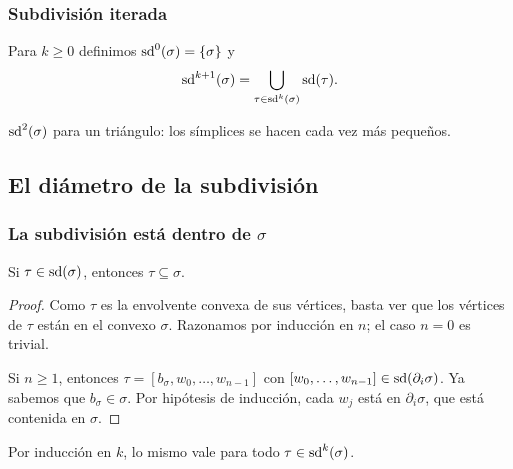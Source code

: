 \begin{frame}
  \frametitle{Subdivisión iterada}

  \begin{definition}
    Para $k\geq0$ definimos $\operatorname{sd}^0(\sigma)=\{\sigma\}$ y
    \[
      \operatorname{sd}^{k+1}(\sigma)=\bigcup_{\tau\in\operatorname{sd}^k(\sigma)}\operatorname{sd}(\tau).
    \]
  \end{definition}

  \begin{center}
  \end{center}

  \centering
  $\operatorname{sd}^2(\sigma)$ para un triángulo: los símplices se hacen
  \alert{cada vez más pequeños}.
\end{frame}

\subsection{El diámetro de la subdivisión}

\begin{frame}
  \frametitle{La subdivisión está dentro de $\sigma$}

  \begin{lemma}
    Si $\tau\in\operatorname{sd}(\sigma)$, entonces $\tau\subseteq\sigma$.
  \end{lemma}

  \begin{proof}
    Como $\tau$ es la envolvente convexa de sus vértices, basta ver que los
    vértices de $\tau$ están en el convexo $\sigma$. Razonamos por
    inducción en $n$; el caso $n=0$ es trivial.

    \medskip

    Si $n\geq1$, entonces $\tau=[b_\sigma,w_0,\ldots,w_{n-1}]$ con
    $[w_0,\ldots,w_{n-1}]\in\operatorname{sd}(\partial_i\sigma)$. Ya sabemos que
    $b_\sigma\in\sigma$. Por hipótesis de inducción, cada $w_j$ está en
    $\partial_i\sigma$, que está contenida en $\sigma$.
  \end{proof}

  Por inducción en $k$, lo mismo vale para todo $\tau\in\operatorname{sd}^k(\sigma)$.
\end{frame}

